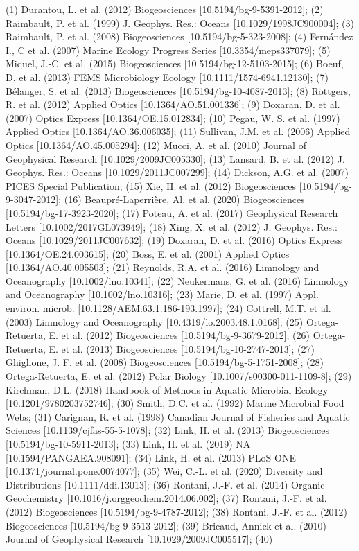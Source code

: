 \begingroup\fontsize{4}{6}\selectfont

\begin{ThreePartTable}
\begin{TableNotes}
\item (1) Durantou, L. et al. (2012) Biogeosciences [10.5194/bg-9-5391-2012]; (2) Raimbault, P. et al. (1999) J. Geophys. Res.: Oceans [10.1029/1998JC900004]; (3) Raimbault, P. et al. (2008) Biogeosciences [10.5194/bg-5-323-2008]; (4) Fernández I., C et al. (2007) Marine Ecology Progress Series [10.3354/meps337079]; (5) Miquel, J.-C. et al. (2015) Biogeosciences [10.5194/bg-12-5103-2015]; (6) Boeuf, D. et al. (2013) FEMS Microbiology Ecology [10.1111/1574-6941.12130]; (7) Bélanger, S. et al. (2013) Biogeosciences [10.5194/bg-10-4087-2013]; (8) Röttgers, R. et al. (2012) Applied Optics [10.1364/AO.51.001336]; (9) Doxaran, D. et al. (2007) Optics Express [10.1364/OE.15.012834]; (10) Pegau, W. S. et al. (1997) Applied Optics [10.1364/AO.36.006035]; (11) Sullivan, J.M. et al. (2006) Applied Optics [10.1364/AO.45.005294]; (12) Mucci, A. et al. (2010) Journal of Geophysical Research [10.1029/2009JC005330]; (13) Lansard, B. et al. (2012) J. Geophys. Res.: Oceans [10.1029/2011JC007299]; (14) Dickson, A.G. et al. (2007) PICES Special Publication; (15) Xie, H. et al. (2012) Biogeosciences [10.5194/bg-9-3047-2012]; (16) Beaupré-Laperrière, Al. et al. (2020) Biogeosciences [10.5194/bg-17-3923-2020]; (17) Poteau, A. et al. (2017) Geophysical Research Letters [10.1002/2017GL073949]; (18) Xing, X. et al. (2012) J. Geophys. Res.: Oceans [10.1029/2011JC007632]; (19) Doxaran, D. et al. (2016) Optics Express [10.1364/OE.24.003615]; (20) Boss, E. et al. (2001) Applied Optics [10.1364/AO.40.005503]; (21) Reynolds, R.A. et al. (2016) Limnology and Oceanography [10.1002/lno.10341]; (22) Neukermans, G. et al. (2016) Limnology and Oceanography [10.1002/lno.10316]; (23) Marie, D. et al. (1997) Appl. environ. microb. [10.1128/AEM.63.1.186-193.1997]; (24) Cottrell, M.T. et al. (2003) Limnology and Oceanography [10.4319/lo.2003.48.1.0168]; (25) Ortega-Retuerta, E. et al. (2012) Biogeosciences [10.5194/bg-9-3679-2012]; (26) Ortega-Retuerta, E. et al. (2013) Biogeosciences [10.5194/bg-10-2747-2013]; (27) Ghiglione, J. F. et al. (2008) Biogeosciences [10.5194/bg-5-1751-2008]; (28) Ortega-Retuerta, E. et al. (2012) Polar Biology [10.1007/s00300-011-1109-8]; (29) Kirchman, D.L. (2018) Handbook of Methods in Aquatic Microbial Ecology [10.1201/9780203752746]; (30) Smith, D.C. et al. (1992) Marine Microbial Food Webs; (31) Carignan, R. et al. (1998) Canadian Journal of Fisheries and Aquatic Sciences [10.1139/cjfas-55-5-1078]; (32) Link, H. et al. (2013) Biogeosciences [10.5194/bg-10-5911-2013]; (33) Link, H. et al. (2019) NA [10.1594/PANGAEA.908091]; (34) Link, H. et al. (2013) PLoS ONE [10.1371/journal.pone.0074077]; (35) Wei, C.‐L. et al. (2020) Diversity and Distributions [10.1111/ddi.13013]; (36) Rontani, J.-F. et al. (2014) Organic Geochemistry [10.1016/j.orggeochem.2014.06.002]; (37) Rontani, J.-F. et al. (2012) Biogeosciences [10.5194/bg-9-4787-2012]; (38) Rontani, J.-F. et al. (2012) Biogeosciences [10.5194/bg-9-3513-2012]; (39) Bricaud, Annick et al. (2010) Journal of Geophysical Research [10.1029/2009JC005517]; (40) 
\end{TableNotes}
\end{ThreePartTable}
